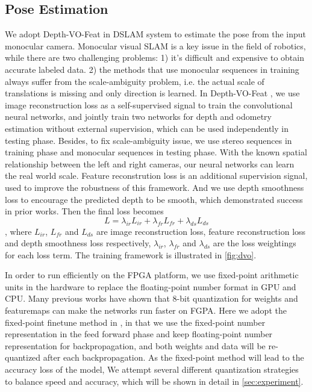 \subsection{Pose Estimation}
We adopt Depth-VO-Feat \cite{Zhan:2018e92} in DSLAM system to estimate the pose from the input monocular camera. Monocular visual SLAM is a key issue in the field of robotics, while there are two challenging problems: 1) it's difficult and expensive to obtain accurate labeled data. 2) the methods that use monocular sequences in training always suffer from the scale-ambiguity problem, i.e. the actual scale of translations is missing and only direction is learned. In Depth-VO-Feat \cite{Zhan:2018e92}, we use image reconstruction loss as a self-supervised signal to train the convolutional neural networks, and jointly train two networks for depth and odometry estimation without external supervision, which can be used independently in testing phase. Besides, to fix scale-ambiguity issue, we use stereo sequences in training phase and monocular sequences in testing phase. With the known spatial relationship between the left and right cameras, our neural networks can learn the real world scale. Feature reconstrution loss is an additional supervision signal, used to improve the robustness of this framework. And we use depth smoothness loss to encourage the predicted depth to be smooth, which demonstrated success in prior works. Then the final loss becomes $$L=\lambda_{ir}L_{ir}+\lambda_{fr}L_{fr}+\lambda_{ds}L_{ds}$$, where $L_{ir}$, $L_{fr}$ and $L_{ds}$ are image reconstruction loss, feature reconstruction loss and depth smoothness loss respectively, $\lambda_{ir}$, $\lambda_{fr}$ and $\lambda_{ds}$ are the loss weightings for each loss term. The training framework is illustrated in \cref{fig:dvo}.


In order to run efficiently on the FPGA platform, we use fixed-point arithmetic units in the hardware to replace the floating-point number format in GPU and CPU. Many previous works have shown that 8-bit quantization for weights and featuremaps can make the networks run faster on FGPA. Here we adopt the fixed-point finetune method in \cite{Yu:2018:IDC:3299999.3283452}, in that we use the fixed-point number representation in the feed forward phase and keep floating-point number representation for backpropagation, and both weights and data will be re-quantized after each backpropagation. As the fixed-point method will lead to the accuracy loss of the model, We attempt several different quantization strategies to balance speed and accuracy, which will be shown in detail in \cref{sec:experiment}.

